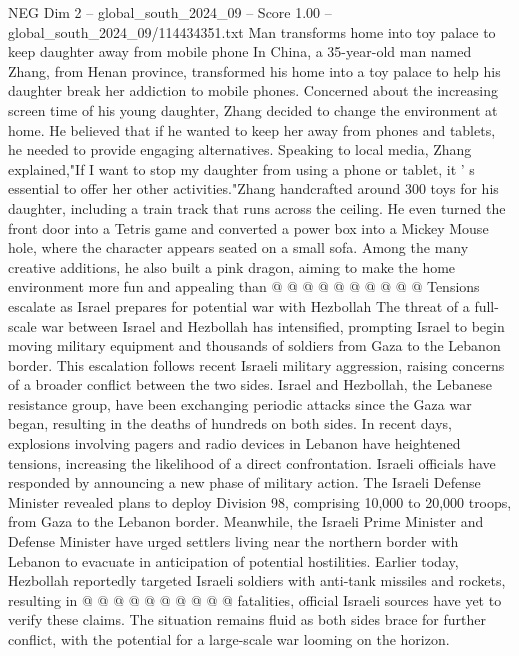 \begin{textsample}{NEG Dim 2 – global\_south\_2024\_09 – Score 1.00 – global\_south\_2024\_09/114434351.txt}  \label{ex:f2_neg_252}
Man transforms home into toy palace to keep daughter away from mobile phone In China, a 35-year-old man named Zhang, from Henan province, transformed his home into a toy palace to help his daughter break her addiction to mobile phones.
Concerned about the increasing screen time of his young daughter, Zhang decided to change the environment at home.
He believed that if he wanted to keep her away from phones and tablets, he needed to provide engaging alternatives.
Speaking to local media, Zhang explained,"If I want to stop my daughter from using a phone or tablet, it ' s essential to offer her other activities."Zhang handcrafted around 300 toys for his daughter, including a train track that runs across the ceiling.
He even turned the front door into a Tetris game and converted a power box into a Mickey Mouse hole, where the character appears seated on a small sofa.
Among the many creative additions, he also built a pink dragon, aiming to make the home environment more fun and appealing than @ @ @ @ @ @ @ @ @ @ Tensions escalate as Israel prepares for potential war with Hezbollah The threat of a full-scale war between Israel and Hezbollah has intensified, prompting Israel to begin moving military equipment and thousands of soldiers from Gaza to the Lebanon border.
This escalation follows recent Israeli military aggression, raising concerns of a broader conflict between the two sides.
Israel and Hezbollah, the Lebanese resistance group, have been exchanging periodic attacks since the Gaza war began, resulting in the deaths of hundreds on both sides.
In recent days, explosions involving pagers and radio devices in Lebanon have heightened tensions, increasing the likelihood of a direct confrontation.
Israeli officials have responded by announcing a new phase of military action.
The Israeli Defense Minister revealed plans to deploy Division 98, comprising 10,000 to 20,000 troops, from Gaza to the Lebanon border.
Meanwhile, the Israeli Prime Minister and Defense Minister have urged settlers living near the northern border with Lebanon to evacuate in anticipation of potential hostilities.
Earlier today, Hezbollah reportedly targeted Israeli soldiers with anti-tank missiles and rockets, resulting in @ @ @ @ @ @ @ @ @ @ fatalities, official Israeli sources have yet to verify these claims.
The situation remains fluid as both sides brace for further conflict, with the potential for a large-scale war looming on the horizon.

\end{textsample}
